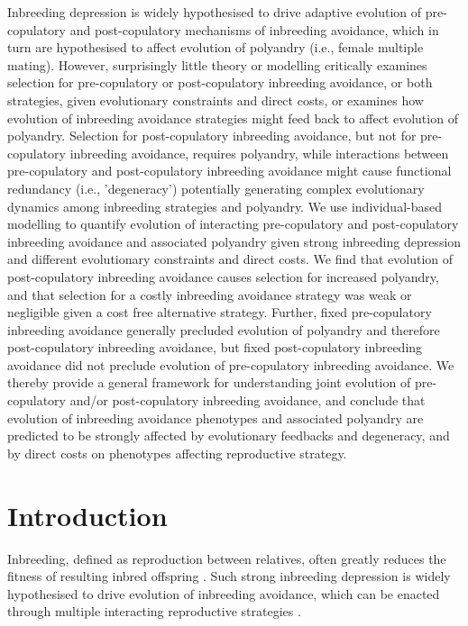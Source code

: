 \documentclass[12pt]{article}
\begin{document}
Inbreeding depression is widely hypothesised to drive adaptive evolution of pre-copulatory and post-copulatory mechanisms of inbreeding avoidance, which in turn are hypothesised to affect evolution of polyandry (i.e., female multiple mating). However, surprisingly little theory or modelling critically examines selection for pre-copulatory or post-copulatory inbreeding avoidance, or both strategies, given evolutionary constraints and direct costs, or examines how evolution of inbreeding avoidance strategies might feed back to affect evolution of polyandry. Selection for post-copulatory inbreeding avoidance, but not for pre-copulatory inbreeding avoidance, requires polyandry, while interactions between pre-copulatory and post-copulatory inbreeding avoidance might cause functional redundancy (i.e., 'degeneracy') potentially generating complex evolutionary dynamics among inbreeding strategies and polyandry. We use individual-based modelling to quantify evolution of interacting pre-copulatory and post-copulatory inbreeding avoidance and associated polyandry given strong inbreeding depression and different evolutionary constraints and direct costs. We find that evolution of post-copulatory inbreeding avoidance causes selection for increased polyandry, and that selection for a costly inbreeding avoidance strategy was weak or negligible given a cost free alternative strategy. Further, fixed pre-copulatory inbreeding avoidance generally precluded evolution of polyandry and therefore post-copulatory inbreeding avoidance, but fixed post-copulatory inbreeding avoidance did not preclude evolution of pre-copulatory inbreeding avoidance. We thereby provide a general framework for understanding joint evolution of pre-copulatory and/or post-copulatory inbreeding avoidance, and conclude that evolution of inbreeding avoidance phenotypes and associated polyandry are predicted to be strongly affected by evolutionary feedbacks and degeneracy, and by direct costs on phenotypes affecting reproductive strategy.


\section*{Introduction}

Inbreeding, defined as reproduction between relatives, often greatly reduces the fitness of resulting inbred offspring \cite[termed `inbreeding depression';][]{Charlesworth1999, Keller2002, Charlesworth2009}. Such strong inbreeding depression is widely hypothesised to drive evolution of inbreeding avoidance, which can be enacted through multiple interacting reproductive strategies \cite[][]{Parker1979, Parker2006, Pusey1996, Szulkin2012}. 
\end{document}
